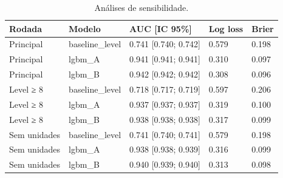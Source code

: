 \begin{table}
\caption{Análises de sensibilidade.}
\label{tab:sens}
\begin{tabular}{lllll}
\toprule
Rodada & Modelo & AUC [IC 95\%] & Log loss & Brier \\
\midrule
Principal & baseline\_level & 0.741 [0.740; 0.742] & 0.579 & 0.198 \\
Principal & lgbm\_A & 0.941 [0.941; 0.941] & 0.310 & 0.097 \\
Principal & lgbm\_B & 0.942 [0.942; 0.942] & 0.308 & 0.096 \\
Level ≥ 8 & baseline\_level & 0.718 [0.717; 0.719] & 0.597 & 0.206 \\
Level ≥ 8 & lgbm\_A & 0.937 [0.937; 0.937] & 0.319 & 0.100 \\
Level ≥ 8 & lgbm\_B & 0.938 [0.938; 0.938] & 0.317 & 0.099 \\
Sem unidades & baseline\_level & 0.741 [0.740; 0.741] & 0.579 & 0.198 \\
Sem unidades & lgbm\_A & 0.938 [0.938; 0.939] & 0.316 & 0.099 \\
Sem unidades & lgbm\_B & 0.940 [0.939; 0.940] & 0.313 & 0.098 \\
\bottomrule
\end{tabular}
\end{table}
